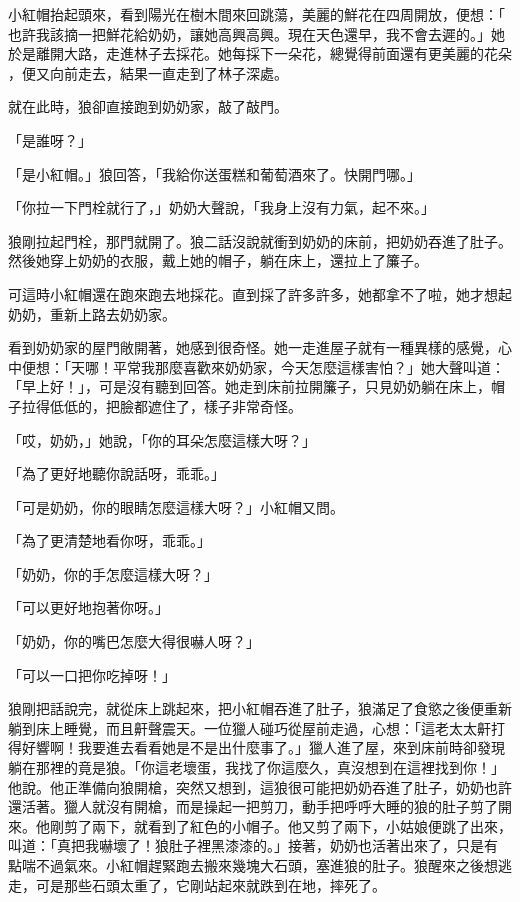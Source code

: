 \documentclass[oneside,11pt]{memoir} %
\begin{document}
小紅帽抬起頭來，看到陽光在樹木間來回跳蕩，美麗的鮮花在四周開放，便想：「
也許我該摘一把鮮花給奶奶，讓她高興高興。現在天色還早，我不會去遲的。」她
於是離開大路，走進林子去採花。她每採下一朵花，總覺得前面還有更美麗的花朵
，便又向前走去，結果一直走到了林子深處。

就在此時，狼卻直接跑到奶奶家，敲了敲門。

「是誰呀？」

「是小紅帽。」狼回答，「我給你送蛋糕和葡萄酒來了。快開門哪。」

「你拉一下門栓就行了，」奶奶大聲說，「我身上沒有力氣，起不來。」

狼剛拉起門栓，那門就開了。狼二話沒說就衝到奶奶的床前，把奶奶吞進了肚子。
然後她穿上奶奶的衣服，戴上她的帽子，躺在床上，還拉上了簾子。

可這時小紅帽還在跑來跑去地採花。直到採了許多許多，她都拿不了啦，她才想起
奶奶，重新上路去奶奶家。

看到奶奶家的屋門敞開著，她感到很奇怪。她一走進屋子就有一種異樣的感覺，心
中便想：「天哪！平常我那麼喜歡來奶奶家，今天怎麼這樣害怕？」她大聲叫道：
「早上好！」，可是沒有聽到回答。她走到床前拉開簾子，只見奶奶躺在床上，帽
子拉得低低的，把臉都遮住了，樣子非常奇怪。

「哎，奶奶，」她說，「你的耳朵怎麼這樣大呀？」

「為了更好地聽你說話呀，乖乖。」

「可是奶奶，你的眼睛怎麼這樣大呀？」小紅帽又問。

「為了更清楚地看你呀，乖乖。」

「奶奶，你的手怎麼這樣大呀？」

「可以更好地抱著你呀。」

「奶奶，你的嘴巴怎麼大得很嚇人呀？」

「可以一口把你吃掉呀！」

狼剛把話說完，就從床上跳起來，把小紅帽吞進了肚子，狼滿足了食慾之後便重新
躺到床上睡覺，而且鼾聲震天。一位獵人碰巧從屋前走過，心想：「這老太太鼾打
得好響啊！我要進去看看她是不是出什麼事了。」獵人進了屋，來到床前時卻發現
躺在那裡的竟是狼。「你這老壞蛋，我找了你這麼久，真沒想到在這裡找到你！」
他說。他正準備向狼開槍，突然又想到，這狼很可能把奶奶吞進了肚子，奶奶也許
還活著。獵人就沒有開槍，而是操起一把剪刀，動手把呼呼大睡的狼的肚子剪了開
來。他剛剪了兩下，就看到了紅色的小帽子。他又剪了兩下，小姑娘便跳了出來，
叫道：「真把我嚇壞了！狼肚子裡黑漆漆的。」接著，奶奶也活著出來了，只是有
點喘不過氣來。小紅帽趕緊跑去搬來幾塊大石頭，塞進狼的肚子。狼醒來之後想逃
走，可是那些石頭太重了，它剛站起來就跌到在地，摔死了。
\end{document}
